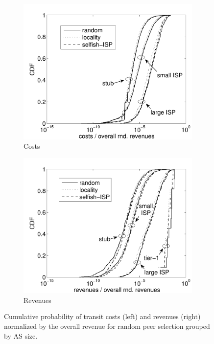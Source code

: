 \begin{figure}[bt]
	\centering
	\begin{subfigure}[b]{0.49\textwidth}
	  \includegraphics[width=\textwidth]{aslevel/p2p/results/figs/costs_CDF}
    \caption{Costs}
    \label{fig:costs_CDF}
	\end{subfigure}
	\begin{subfigure}[b]{0.49\textwidth}
	  \includegraphics[width=\textwidth]{aslevel/p2p/results/figs/revenues_CDF}
    \caption{Revenues}
 	 	\label{fig:revenues_CDF}
	\end{subfigure}
 	\caption{Cumulative probability of transit costs (left) and revenues (right) normalized by the overall revenue for random peer selection grouped by AS size.}
\end{figure}

